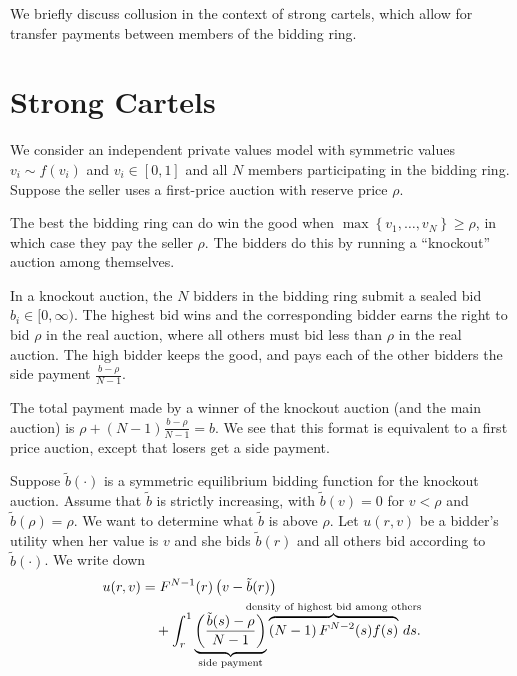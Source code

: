 
We briefly discuss collusion in the context of strong cartels, which allow for transfer payments between members of the bidding ring.

\section{Strong Cartels}

We consider an independent private values model with symmetric values $v_i \sim f(v_i)$ and $v_i \in [0,1]$ and all $N$ members participating in the bidding ring. Suppose the seller uses a first-price auction with reserve price $\rho$.

The best the bidding ring can do win the good when $\max \left\{v_1,\ldots,v_N\right\} \ge \rho$, in which case they pay the seller $\rho$.
The bidders do this by running a ``knockout'' auction among themselves.

\begin{definition}
	In a knockout auction, the $N$ bidders in the bidding ring submit a sealed bid $b_i \in [0,\infty)$. The highest bid wins and the corresponding bidder earns the right to bid $\rho$ in the real auction, where all others must bid less than $\rho$ in the real auction. The high bidder keeps the good, and pays each of the other bidders the side payment $\frac{b-\rho}{N-1}$.
\end{definition}

The total payment made by a winner of the knockout auction (and the main auction) is $\rho + (N-1) \frac{b-\rho}{N-1} = b$. We see that this format is equivalent to a first price auction, except that losers get a side payment.

Suppose $\tilde{b}(\cdot )$ is a symmetric equilibrium bidding function for the knockout auction. Assume that $\tilde{b}$ is strictly increasing, with $\tilde{b}(v) = 0$ for $v < \rho$ and $\tilde{b}(\rho) = \rho$. We want to determine what $\tilde{b}$ is above $\rho$. Let $u(r,v)$ be a bidder's utility when her value is $v$ and she bids $\tilde{b}(r)$ and all others bid according to $\tilde{b}(\cdot )$.
We write down
\begin{align}
	u(r,v)
	&= F^{N-1}(r)\left( v - \tilde{b}(r) \right) \\
	&\quad + \int_{r}^{1}
		\underbrace{\left(\frac{\tilde{b}(s) - \rho}{N-1}\right)}_{\text{side payment}}
		\overbrace{\left( N-1 \right)F^{N-2}(s)f(s)}^{\mathclap{\text{density of highest bid among others}}}\,ds
.\end{align}


